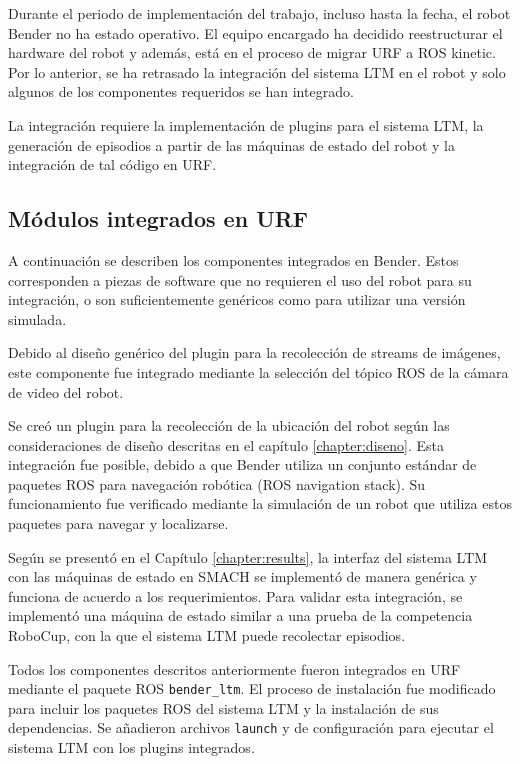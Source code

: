 Durante el periodo de implementación del trabajo, incluso hasta la fecha, el robot Bender no ha estado operativo. El equipo encargado ha decidido reestructurar el hardware del robot y además, está en el proceso de migrar URF a ROS kinetic. Por lo anterior, se ha retrasado la integración del sistema LTM en el robot y solo algunos de los componentes requeridos se han integrado.

La integración requiere la implementación de plugins para el sistema LTM, la generación de episodios a partir de las máquinas de estado del robot y la integración de tal código en URF.

\subsection{Módulos integrados en URF}

A continuación se describen los componentes integrados en Bender. Estos corresponden a piezas de software que no requieren el uso del robot para su integración, o son suficientemente genéricos como para utilizar una versión simulada.

 Debido al diseño genérico del plugin para la recolección de streams de imágenes, este componente fue integrado mediante la selección del tópico ROS de la cámara de video del robot.

 Se creó un plugin para la recolección de la ubicación del robot según las consideraciones de diseño descritas en el capítulo \ref{chapter:diseno}. Esta integración fue posible, debido a que Bender utiliza un conjunto estándar de paquetes ROS para navegación robótica (ROS navigation stack). Su funcionamiento fue verificado mediante la simulación de un robot que utiliza estos paquetes para navegar y localizarse.

 Según se presentó en el Capítulo \ref{chapter:results}, la interfaz del sistema LTM con las máquinas de estado en SMACH se implementó de manera genérica y funciona de acuerdo a los requerimientos. Para validar esta integración, se implementó una máquina de estado similar a una prueba de la competencia RoboCup, con la que el sistema LTM puede recolectar episodios.

 Todos los componentes descritos anteriormente fueron integrados en URF mediante el paquete ROS \texttt{bender\_ltm}. El proceso de instalación fue modificado para incluir los paquetes ROS del sistema LTM y la instalación de sus dependencias. Se añadieron archivos \texttt{launch} y de configuración para ejecutar el sistema LTM con los plugins integrados.

